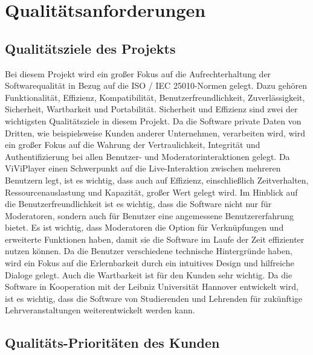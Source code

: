 \section{Qualitätsanforderungen}

	\subsection{Qualitätsziele des Projekts}
	
	Bei diesem Projekt wird ein großer Fokus auf die Aufrechterhaltung der Softwarequalität in Bezug auf die ISO / IEC 25010-Normen gelegt. Dazu gehören Funktionalität, Effizienz, Kompatibilität, Benutzerfreundlichkeit, Zuverlässigkeit, Sicherheit, Wartbarkeit und Portabilität.
    \linebreak
    Sicherheit und Effizienz sind zwei der wichtigsten Qualitätsziele in diesem Projekt. Da die Software private Daten von Dritten, wie beispielsweise Kunden anderer Unternehmen, verarbeiten wird, wird ein großer Fokus auf die Wahrung der Vertraulichkeit, Integrität und Authentifizierung bei allen Benutzer- und Moderatorinteraktionen gelegt.
    \linebreak
    Da ViViPlayer einen Schwerpunkt auf die Live-Interaktion zwischen mehreren Benutzern legt, ist es wichtig, dass auch auf Effizienz, einschließlich Zeitverhalten, Ressourcenauslastung und Kapazität, großer Wert gelegt wird.
    \linebreak
    Im Hinblick auf die Benutzerfreundlichkeit ist es wichtig, dass die Software nicht nur für Moderatoren, sondern auch für Benutzer eine angemessene Benutzererfahrung bietet. Es ist wichtig, dass Moderatoren die Option für Verknüpfungen und erweiterte Funktionen haben, damit sie die Software im Laufe der Zeit effizienter nutzen können. Da die Benutzer verschiedene technische Hintergründe haben, wird ein Fokus auf die Erlernbarkeit durch ein intuitives Design und hilfreiche Dialoge gelegt.
    \linebreak
    Auch die Wartbarkeit ist für den Kunden sehr wichtig. Da die Software in Kooperation mit der Leibniz Universität Hannover entwickelt wird, ist es wichtig, dass die Software von Studierenden und Lehrenden für zukünftige Lehrveranstaltungen weiterentwickelt werden kann.
	
	\subsection{Qualitäts-Prioritäten des Kunden}
		
